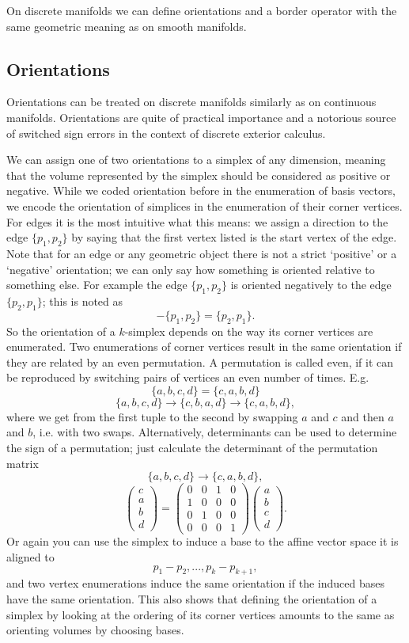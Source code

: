 On discrete manifolds we can define orientations and a border operator with the same geometric meaning as on smooth manifolds.

\subsection{Orientations}
\label{subsec:SC_orientations}
Orientations can be treated on discrete manifolds similarly as on continuous manifolds. Orientations are quite of  practical importance and a notorious source of switched sign errors in the context of discrete exterior calculus. 

We can assign one of two orientations to a simplex of any dimension, meaning that the volume represented by the simplex should be considered as positive or negative. While we coded orientation before in the enumeration of basis vectors, we encode the orientation of simplices in the enumeration of their corner vertices.  For edges it is the most intuitive what this means: we assign a direction to the edge $\{p_1,p_2\}$ by saying that the first vertex listed is the start vertex of the edge. Note that for an edge or any geometric object there is not a strict `positive' or a `negative' orientation; we can only say how something is oriented relative to something else. For example the edge $\{p_1,p_2\}$ is oriented negatively to the edge $\{p_2,p_1\}$; this is noted as
\[-\{p_1,p_2\} = \{p_2,p_1\}.\]
So the orientation of a $k$-simplex depends on the way its corner vertices are enumerated. Two enumerations of corner vertices result in the same orientation if they are related by an even permutation. A permutation is called even, if it can be reproduced by switching pairs of vertices an even number of times. E.g.
\[\{a,b,c,d\} = \{c,a,b,d\}\]
\[\{a,b,c,d\} \rightarrow \{c,b,a,d\}\rightarrow \{c,a,b,d\},\]
where we get from the first tuple to the second by swapping  $a$ and $c$ and then $a$ and $b$, i.e. with two swaps. Alternatively, determinants can be used to determine the sign of a permutation; just calculate the determinant of the permutation matrix
\[\{a,b,c,d\} \rightarrow \{c,a,b,d\},\]
\[\begin{pmatrix}c\\a\\b\\d \end{pmatrix}=\begin{pmatrix} 0 & 0 & 1 &0 \\ 1 &0&0&0 \\ 0&1&0&0 \\ 0&0&0&1 \end{pmatrix}\begin{pmatrix} a\\b\\c\\d \end{pmatrix}.\]
Or again you can use the simplex to induce a base to the affine vector space it is aligned to
\[p_1 -p_2,...,p_{k}-p_{k+1},\]
and two vertex enumerations induce the same orientation if the induced bases have the same orientation. This also shows that defining the orientation of a simplex by looking at the ordering of its corner vertices amounts to the same as orienting volumes by choosing bases.

